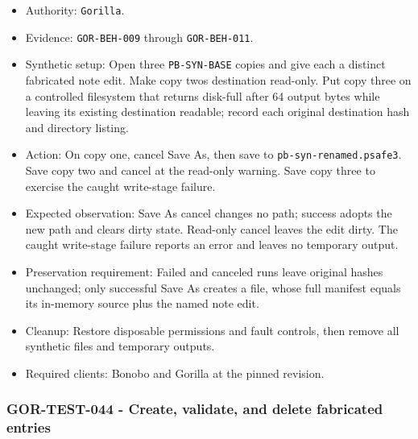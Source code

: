 \documentclass[
  letterpaper,
]{article}
\newcommand{\passthrough}[1]{#1}
\providecommand{\tightlist}{%
  \setlength{\itemsep}{0pt}\setlength{\parskip}{0pt}}
\begin{document}
\begin{itemize}
\tightlist
\item
  Authority: \passthrough{\lstinline!Gorilla!}.
\item
  Evidence: \nolinkurl{GOR-BEH-009} through \nolinkurl{GOR-BEH-011}.
\item
  Synthetic setup: Open three \nolinkurl{PB-SYN-BASE} copies and give each a distinct fabricated note edit. Make copy
  two\textquotesingle s destination read-only. Put copy three on a controlled filesystem that returns disk-full after 64
  output bytes while leaving its existing destination readable; record each original destination hash and directory
  listing.
\item
  Action: On copy one, cancel Save As, then save to \nolinkurl{pb-syn-renamed.psafe3}. Save copy two and cancel at the
  read-only warning. Save copy three to exercise the caught write-stage failure.
\item
  Expected observation: Save As cancel changes no path; success adopts the new path and clears dirty state. Read-only
  cancel leaves the edit dirty. The caught write-stage failure reports an error and leaves no temporary output.
\item
  Preservation requirement: Failed and canceled runs leave original hashes unchanged; only successful Save As creates a
  file, whose full manifest equals its in-memory source plus the named note edit.
\item
  Cleanup: Restore disposable permissions and fault controls, then remove all synthetic files and temporary outputs.
\item
  Required clients: Bonobo and Gorilla at the pinned revision.
\end{itemize}

\subsubsection{GOR-TEST-044 - Create, validate, and delete fabricated
entries}\label{gor-test-044---create-validate-and-delete-fabricated-entries}
\end{document}
